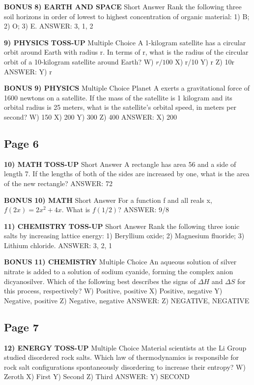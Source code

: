 \documentclass{article}
\begin{document}
\textbf{BONUS}
\textbf{8) EARTH AND SPACE}
Short Answer Rank the following three soil horizons in order of lowest to highest concentration of organic material: 1) B; 2) O; 3) E.
ANSWER: 3, 1, 2

\textbf{9) PHYSICS}
\textbf{TOSS-UP}
Multiple Choice A 1-kilogram satellite has a circular orbit around Earth with radius r. In terms of r, what is the radius of the circular orbit of a 10-kilogram satellite around Earth?
W) $r/100$
X) r/10
Y) r
Z) 10r
ANSWER: Y) r

\textbf{BONUS}
\textbf{9) PHYSICS}
Multiple Choice Planet A exerts a gravitational force of 1600 newtons on a satellite. If the mass of the satellite is 1 kilogram and its orbital radius is 25 meters, what is the satellite's orbital speed, in meters per second?
W) 150
X) 200
Y) 300
Z) 400
ANSWER: X) 200

\subsection*{Page 6}
\textbf{10) MATH}
\textbf{TOSS-UP}
Short Answer A rectangle has area 56 and a side of length 7. If the lengths of both of the sides are increased by one, what is the area of the new rectangle?
ANSWER: 72

\textbf{BONUS}
\textbf{10) MATH}
Short Answer For a function f and all reals x, $f(2x)=2x^{2}+4x$. What is $f(1/2)$?
ANSWER: 9/8

\textbf{11) CHEMISTRY}
\textbf{TOSS-UP}
Short Answer Rank the following three ionic salts by increasing lattice energy: 1) Beryllium oxide; 2) Magnesium fluoride; 3) Lithium chloride.
ANSWER: 3, 2, 1

\textbf{BONUS}
\textbf{11) CHEMISTRY}
Multiple Choice An aqueous solution of silver nitrate is added to a solution of sodium cyanide, forming the complex anion dicyanosilver. Which of the following best describes the signs of $\Delta H$ and $\Delta S$ for this process, respectively?
W) Positive, positive
X) Positive, negative
Y) Negative, positive
Z) Negative, negative
ANSWER: Z) NEGATIVE, NEGATIVE

\subsection*{Page 7}
\textbf{12) ENERGY}
\textbf{TOSS-UP}
Multiple Choice Material scientists at the Li Group studied disordered rock salts. Which law of thermodynamics is responsible for rock salt configurations spontaneously disordering to increase their entropy?
W) Zeroth
X) First
Y) Second
Z) Third
ANSWER: Y) SECOND
\end{document}
